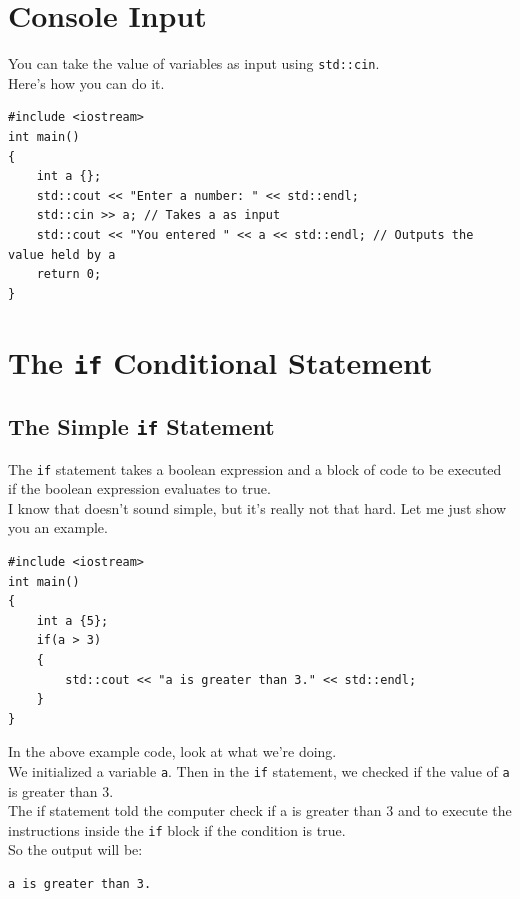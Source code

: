 \documentclass[letterpaper, 12pt]{book}
\begin{document}
\section{Console Input}
You can take the value of variables as input using \lstinline{std::cin}.\\
Here's how you can do it.
\begin{lstlisting}
#include <iostream>
int main()
{
	int a {};
	std::cout << "Enter a number: " << std::endl;
	std::cin >> a; // Takes a as input
	std::cout << "You entered " << a << std::endl; // Outputs the value held by a
	return 0;
}
\end{lstlisting}
\section{The \lstinline{if} Conditional Statement}
\subsection{The Simple \lstinline{if} Statement}
The \lstinline{if} statement takes a boolean expression and a block of code to be executed if the boolean expression evaluates to true.\\
I know that doesn't sound simple, but it's really not that hard. Let me just show you an example.
\begin{lstlisting}
#include <iostream>
int main()
{
	int a {5};
	if(a > 3)
	{
		std::cout << "a is greater than 3." << std::endl;
	}
}
\end{lstlisting}
In the above example code, look at what we're doing.\\
We initialized a variable \lstinline{a}. Then in the \lstinline{if} statement, we checked if the value of \lstinline{a} is greater than 3.\\
The if statement told the computer check if a is greater than 3 and to execute the instructions inside the \lstinline{if} block if the condition is true.\\
So the output will be:\\
\begin{lstlisting}
a is greater than 3.
\end{lstlisting}
\end{document}
